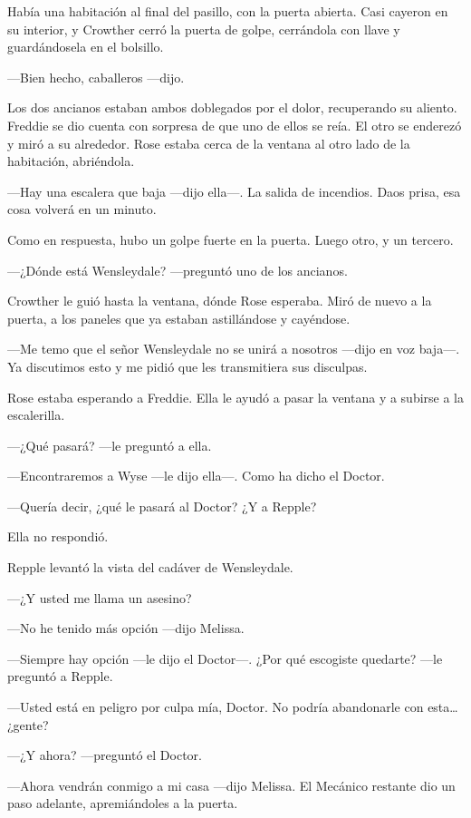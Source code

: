 {Había una habitación al final del pasillo, con la puerta abierta. Casi
	cayeron en su interior, y Crowther cerró la puerta de golpe, cerrándola
con llave y guardándosela en el bolsillo.}

{---Bien hecho, caballeros ---dijo.}

{Los dos ancianos estaban ambos doblegados por el dolor, recuperando su
	aliento. Freddie se dio cuenta con sorpresa de que uno de ellos se reía.
	El otro se enderezó y miró a su alrededor. Rose estaba cerca de la
ventana al otro lado de la habitación, abriéndola.}

{---Hay una escalera que baja ---dijo ella---. La salida de incendios.
Daos prisa, esa cosa volverá en un minuto.}

{Como en respuesta, hubo un golpe fuerte en la puerta. Luego otro, y un
tercero.}

{---¿Dónde está Wensleydale? ---preguntó uno de los ancianos.}

{Crowther le guió hasta la ventana, dónde Rose esperaba. Miró de nuevo a
la puerta, a los paneles que ya estaban astillándose y cayéndose.}

{---Me temo que el señor Wensleydale no se unirá a nosotros ---dijo en
	voz baja---. Ya discutimos esto y me pidió que les transmitiera sus
disculpas.}

{Rose estaba esperando a Freddie. Ella le ayudó a pasar la ventana y a
subirse a la escalerilla.}

{---¿Qué pasará? ---le preguntó a ella.}

{---Encontraremos a Wyse ---le dijo ella---. Como ha dicho el Doctor.}

{---Quería decir, ¿qué le pasará al Doctor? ¿Y a Repple?}

{Ella no respondió.}

\mbox{}

{Repple levantó la vista del cadáver de Wensleydale.}

{---¿Y usted me llama un asesino?}

{---No he tenido más opción ---dijo Melissa.}

{---Siempre hay opción ---le dijo el Doctor---. ¿Por qué escogiste
quedarte? ---le preguntó a Repple.}

{---Usted está en peligro por culpa mía, Doctor. No podría abandonarle
	con esta\ldots{} ¿gente?}

{---¿Y ahora? ---preguntó el Doctor.}

{---Ahora vendrán conmigo a mi casa ---dijo Melissa. El Mecánico
restante dio un paso adelante, apremiándoles a la puerta.}

